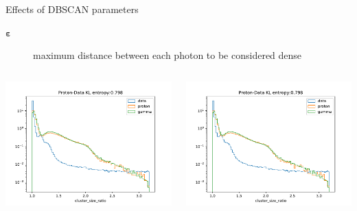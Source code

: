 \begin{frame}{Effects of DBSCAN parameters}
  \begin{description}
    \item[$\mathbf{\varepsilon}$] maximum distance between each photon to be considered dense
  \end{description}
  \begin{columns}[onlytextwidth]
    \begin{column}{0.475\textwidth}
      \centering
      \includegraphics[width=1.1\textwidth, page=14]{fig/175_comparison.pdf}
    \end{column}
  \hfill%
    \begin{column}{0.475\textwidth}
        \centering
        \includegraphics[width=1.1\textwidth, page=7]{fig/175_comparison.pdf}
    \end{column}
  \end{columns}
\end{frame}


